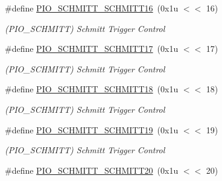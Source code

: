 \begin{DoxyCompactItemize}
\mbox{\label{group__SAME70__PIO_ga5c4cb6edb45581d38eab0468b8905b9c}} 
\#define \mbox{\hyperlink{group__SAME70__PIO_ga5c4cb6edb45581d38eab0468b8905b9c}{P\+I\+O\+\_\+\+S\+C\+H\+M\+I\+T\+T\+\_\+\+S\+C\+H\+M\+I\+T\+T16}}~(0x1u $<$$<$ 16)
\begin{DoxyCompactList}\small\item\em (P\+I\+O\+\_\+\+S\+C\+H\+M\+I\+TT) Schmitt Trigger Control \end{DoxyCompactList}\item 
\mbox{\label{group__SAME70__PIO_ga138be05893f9b96844d973de41e6de55}} 
\#define \mbox{\hyperlink{group__SAME70__PIO_ga138be05893f9b96844d973de41e6de55}{P\+I\+O\+\_\+\+S\+C\+H\+M\+I\+T\+T\+\_\+\+S\+C\+H\+M\+I\+T\+T17}}~(0x1u $<$$<$ 17)
\begin{DoxyCompactList}\small\item\em (P\+I\+O\+\_\+\+S\+C\+H\+M\+I\+TT) Schmitt Trigger Control \end{DoxyCompactList}\item 
\mbox{\label{group__SAME70__PIO_ga2bca8d372d1159da7b064b5c0681a2de}} 
\#define \mbox{\hyperlink{group__SAME70__PIO_ga2bca8d372d1159da7b064b5c0681a2de}{P\+I\+O\+\_\+\+S\+C\+H\+M\+I\+T\+T\+\_\+\+S\+C\+H\+M\+I\+T\+T18}}~(0x1u $<$$<$ 18)
\begin{DoxyCompactList}\small\item\em (P\+I\+O\+\_\+\+S\+C\+H\+M\+I\+TT) Schmitt Trigger Control \end{DoxyCompactList}\item 
\mbox{\label{group__SAME70__PIO_gaff116da2e1b27c50e008c0ae9cf4b0c2}} 
\#define \mbox{\hyperlink{group__SAME70__PIO_gaff116da2e1b27c50e008c0ae9cf4b0c2}{P\+I\+O\+\_\+\+S\+C\+H\+M\+I\+T\+T\+\_\+\+S\+C\+H\+M\+I\+T\+T19}}~(0x1u $<$$<$ 19)
\begin{DoxyCompactList}\small\item\em (P\+I\+O\+\_\+\+S\+C\+H\+M\+I\+TT) Schmitt Trigger Control \end{DoxyCompactList}\item 
\mbox{\label{group__SAME70__PIO_ga71d786a7318afe2c205cf874da861f95}} 
\#define \mbox{\hyperlink{group__SAME70__PIO_ga71d786a7318afe2c205cf874da861f95}{P\+I\+O\+\_\+\+S\+C\+H\+M\+I\+T\+T\+\_\+\+S\+C\+H\+M\+I\+T\+T20}}~(0x1u $<$$<$ 20)
$$
\end{DoxyCompactItemize}
